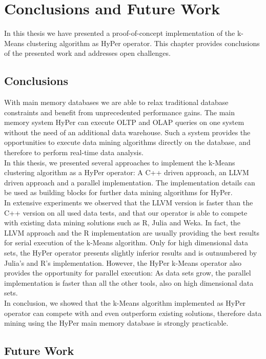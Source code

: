 \chapter{Conclusions and Future Work}\label{chapter:conclusion}
In this thesis we have presented a proof-of-concept implementation of the k-Means clustering algorithm as HyPer operator. This chapter provides conclusions of the presented work and addresses open challenges.

\section{Conclusions}
With main memory databases we are able to relax traditional database constraints and benefit from unprecedented performance gains. The main memory system HyPer can execute OLTP and OLAP queries on one system without the need of an additional data warehouse. Such a system provides the opportunities to execute data mining algorithms directly on the database, and therefore to perform real-time data analysis. 
\\
In this thesis, we presented several approaches to implement the k-Means clustering algorithm as a HyPer operator: A C++ driven approach, an LLVM driven approach and a parallel implementation. The implementation details can be used as building blocks for further data mining algorithms for HyPer.
\\
In extensive experiments we observed that the LLVM version is faster than the C++ version on all used data tests, and that our operator is able to compete with existing data mining solutions such as R, Julia and Weka. In fact, the LLVM approach and the R implementation are usually providing the best results for serial execution of the k-Means algorithm. Only for high dimensional data sets, the HyPer operator presents slightly inferior results and is outnumbered by Julia's and R's implementation. However, the HyPer k-Means operator also provides the opportunity for parallel execution: As data sets grow, the parallel implementation is faster than all the other tools, also on high dimensional data sets.
\\
In conclusion, we showed that the k-Means algorithm implemented as HyPer operator can compete with and even outperform existing solutions, therefore data mining using the HyPer main memory database is strongly practicable.

\section{Future Work}

